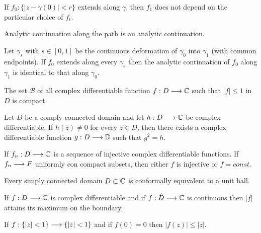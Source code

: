 \documentclass{unswmaths}
\begin{document}
\begin{theorem}
	If $ f_0 : \{ |z -\gamma(0)| < r \} $ extends along $ \gamma $, then $ f_1 $ does not depend on the particular choice of $ f_t $.
\end{theorem}

\begin{theorem}
	Analytic continuation along the path is an analytic continuation.
\end{theorem}

\begin{theorem}
	Let $ \gamma_s $ with $ s \in [0,1] $ be the continuous deformation of $ \gamma_0 $ into $ \gamma_1 $ (with common endpoints). If $ f_0 $ extends along every $ \gamma_s $ then the analytic continuation of $ f_0 $ along $ \gamma_1 $ is identical to that along $ \gamma_0 $.
\end{theorem}

\begin{theorem}
	The set $ \mathcal{B} $ of all complex differentiable function $ f : D \longrightarrow \mathbb{C} $ such that $ |f| \leq 1 $ in $ D $ is compact.
\end{theorem}

\begin{theorem}
	Let $ D $ be a comply connected domain and let $ h : D \longrightarrow \mathbb{C} $ be complex differentiable. If $ h(z)  \neq 0 $ for every $ z \in D $, then there exists a complex differentiable function $ g : D \longrightarrow \mathbb{D} $ such that $ g^2 = h $. 
\end{theorem}

\begin{lemma}
	If $ f_n  : D \longrightarrow \mathbb{C} $ is a sequence of injective complex differentiable functions. If $ f_n \longrightarrow F $ uniformly con compact subsets, then either $ f $ is injective or $ f = const $.
\end{lemma}


\begin{theorem}
	Every simply connected domain $ D \subset \mathbb{C} $ is conformally equivalent to a unit ball.
\end{theorem}

\begin{theorem}
	If $ f : D \longrightarrow \mathbb{C} $ is complex differentiable and if $ f: \hat{D} \longrightarrow \mathbb{C} $ is continuous then $ |f| $ attains its maximum on the boundary. 
\end{theorem}

\begin{lemma}
	If $ f : \{ |z| < 1 \} \longrightarrow \{ |z| < 1 \} $ and if $ f(0) =0 $ then $ |f(z)| \leq |z| $.
\end{lemma}
\end{document}
